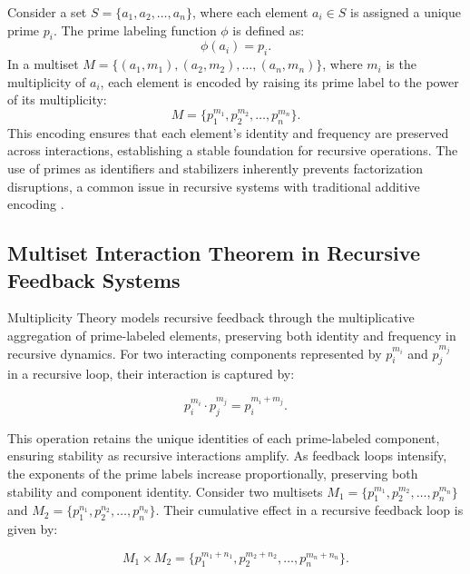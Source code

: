 \documentclass{article}
\theoremstyle{plain}
\begin{document}
Consider a set \( S = \{a_1, a_2, \ldots, a_n\} \), where each element \( a_i \in S \) is assigned a unique prime \( p_i \). The prime labeling function \( \phi \) is defined as:
\begin{equation}
\phi(a_i) = p_i.
\end{equation}
In a multiset \( M = \{(a_1, m_1), (a_2, m_2), \ldots, (a_n, m_n)\} \), where \( m_i \) is the multiplicity of \( a_i \), each element is encoded by raising its prime label to the power of its multiplicity:
\begin{equation}
M = \{p_1^{m_1}, p_2^{m_2}, \ldots, p_n^{m_n}\}.
\end{equation}
This encoding ensures that each element's identity and frequency are preserved across interactions, establishing a stable foundation for recursive operations. The use of primes as identifiers and stabilizers inherently prevents factorization disruptions, a common issue in recursive systems with traditional additive encoding \citep{gauss1801, freeman2004}.

\subsection{Multiset Interaction Theorem in Recursive Feedback Systems}

Multiplicity Theory models recursive feedback through the multiplicative aggregation of prime-labeled elements, preserving both identity and frequency in recursive dynamics. For two interacting components represented by \( p_i^{m_i} \) and \( p_j^{m_j} \) in a recursive loop, their interaction is captured by:

\begin{equation}
p_i^{m_i} \cdot p_j^{m_j} = p_i^{m_i + m_j}.
\end{equation}

This operation retains the unique identities of each prime-labeled component, ensuring stability as recursive interactions amplify. As feedback loops intensify, the exponents of the prime labels increase proportionally, preserving both stability and component identity. Consider two multisets \( M_1 = \{p_1^{m_1}, p_2^{m_2}, \ldots, p_n^{m_n}\} \) and \( M_2 = \{p_1^{n_1}, p_2^{n_2}, \ldots, p_n^{n_n}\} \). Their cumulative effect in a recursive feedback loop is given by:

\begin{equation}
M_1 \times M_2 = \{p_1^{m_1 + n_1}, p_2^{m_2 + n_2}, \ldots, p_n^{m_n + n_n}\}.
\end{equation}
\end{document}
